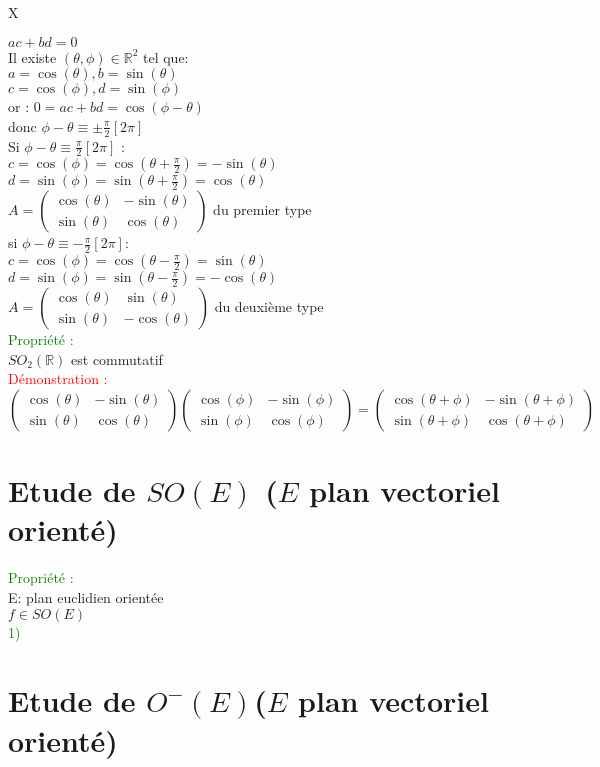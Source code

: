 X\documentclass{article}
\begin{document}
$ac+bd=0$ \\
Il existe $(\theta,\phi) \in \mathbb R^2$ tel que: \\
$a=\cos(\theta),b=\sin(\theta)$ \\
$c=\cos(\phi),d=\sin(\phi)$ \\
or : $0= ac+bd=  \cos(\phi-\theta)$ \\
donc $\phi- \theta \equiv \pm \frac \pi 2 [2\pi]$ \\
Si $\phi - \theta \equiv \frac \pi 2 [2 \pi ]$ : \\
$c=\cos(\phi)=\cos(\theta + \frac \pi 2)=-\sin(\theta)$ \\
$d=\sin(\phi)=\sin(\theta + \frac \pi 2)=\cos(\theta)$ \\
$A=\begin{pmatrix}
\cos(\theta) &- \sin(\theta) \\
\sin(\theta) & \cos(\theta)
\end{pmatrix}$ du premier type  \\
si $\phi - \theta \equiv - \frac \pi 2 [2\pi] :$ \\
$c=\cos(\phi)=\cos(\theta-\frac \pi 2)= \sin(\theta)$ \\
$d=\sin(\phi)=\sin(\theta-\frac \pi 2)=-\cos(\theta)$ \\
$A=\begin{pmatrix}
\cos(\theta) & \sin(\theta) \\
\sin(\theta) & -\cos(\theta)
\end{pmatrix}$ du deuxième type \\
\textcolor{green}{Propriété :} \\
$SO_2(\mathbb R)$ est commutatif\\
\textcolor{red}{Démonstration :} \\
$\begin{pmatrix}
\cos(\theta) & -\sin(\theta) \\
\sin(\theta) & \cos(\theta)
\end{pmatrix}
\begin{pmatrix}
\cos(\phi) & - \sin(\phi) \\
\sin(\phi) & \cos(\phi)
\end{pmatrix}
=
\begin{pmatrix}
\cos(\theta + \phi) & - \sin(\theta + \phi) \\
\sin(\theta + \phi) & \cos(\theta + \phi)
\end{pmatrix}$
\section{Etude de $SO(E)$ ($E$ plan vectoriel orienté)}
\textcolor{green}{Propriété :} \\
E: plan euclidien orientée \\
$f \in SO(E)$ \\
\textcolor{green}{1)}
\section{Etude de $O^-(E)$($E$ plan vectoriel orienté)}
\end{document}
